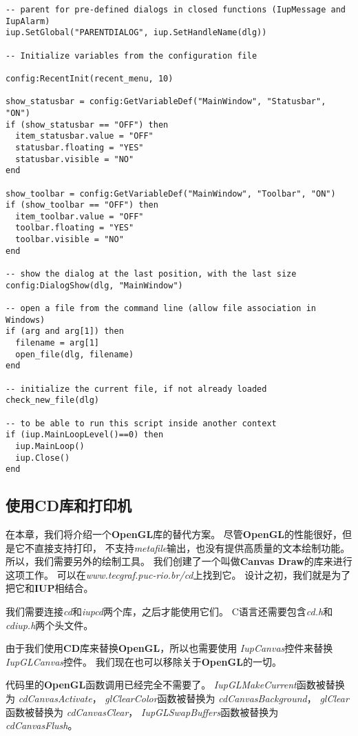 \documentclass{ctexart}
\begin{document}
\begin{lstlisting}
-- parent for pre-defined dialogs in closed functions (IupMessage and IupAlarm)
iup.SetGlobal("PARENTDIALOG", iup.SetHandleName(dlg))

-- Initialize variables from the configuration file

config:RecentInit(recent_menu, 10)
 
show_statusbar = config:GetVariableDef("MainWindow", "Statusbar", "ON")
if (show_statusbar == "OFF") then
  item_statusbar.value = "OFF"
  statusbar.floating = "YES"
  statusbar.visible = "NO"
end

show_toolbar = config:GetVariableDef("MainWindow", "Toolbar", "ON")
if (show_toolbar == "OFF") then
  item_toolbar.value = "OFF"
  toolbar.floating = "YES"
  toolbar.visible = "NO"
end

-- show the dialog at the last position, with the last size
config:DialogShow(dlg, "MainWindow")

-- open a file from the command line (allow file association in Windows)
if (arg and arg[1]) then
  filename = arg[1]
  open_file(dlg, filename)
end

-- initialize the current file, if not already loaded
check_new_file(dlg)

-- to be able to run this script inside another context
if (iup.MainLoopLevel()==0) then
  iup.MainLoop()
  iup.Close()
end
\end{lstlisting}

\subsection{使用CD库和打印机}

在本章，我们将介绍一个\textbf{OpenGL}库的替代方案。
尽管\textbf{OpenGL}的性能很好，但是它不直接支持打印，
不支持\emph{metafile}输出，也没有提供高质量的文本绘制功能。
所以，我们需要另外的绘制工具。
我们创建了一个叫做\textbf{Canvas Draw}的库来进行这项工作。
可以在\emph{www.tecgraf.puc-rio.br/cd}上找到它。
设计之初，我们就是为了把它和\textbf{IUP}相结合。

我们需要连接\emph{cd}和\emph{iupcd}两个库，之后才能使用它们。
C语言还需要包含\emph{cd.h}和\emph{cdiup.h}两个头文件。

由于我们使用\textbf{CD}库来替换\textbf{OpenGL}，所以也需要使用
\emph{IupCanvas}控件来替换\emph{IupGLCanvas}控件。
我们现在也可以移除关于\textbf{OpenGL}的一切。

代码里的\textbf{OpenGL}函数调用已经完全不需要了。
\emph{IupGLMakeCurrent}函数被替换为
\emph{cdCanvasActivate}，
\emph{glClearColor}函数被替换为
\emph{cdCanvasBackground}，
\emph{glClear}函数被替换为
\emph{cdCanvasClear}，
\emph{IupGLSwapBuffers}函数被替换为
\emph{cdCanvasFlush}。
\end{document}
